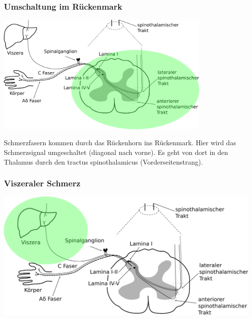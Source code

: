 \documentclass{beamer}
\begin{document}
\begin{frame}
\frametitle{Umschaltung im Rückenmark}

\begin{center}
\includegraphics[width=0.8\textwidth]{Schmerz_aufsteigend_bis_Rueckenmark_Rueckenmark.png}
\end{center}

\pause

Schmerzfasern kommen durch das Rückenhorn ins Rückenmark. Hier wird das Schmerzsignal umgeschaltet (diagonal nach vorne). Es geht von dort in den Thalamus durch den tractus spinothalamicus (Vorderseitenstrang). 

\end{frame}


\begin{frame}

\frametitle{Viszeraler Schmerz}

 \begin{center}
\includegraphics[width=\textwidth]{Schmerz_aufsteigend_bis_Rueckenmark_Viszera.png}
\end{center}


\end{frame}
\end{document}
